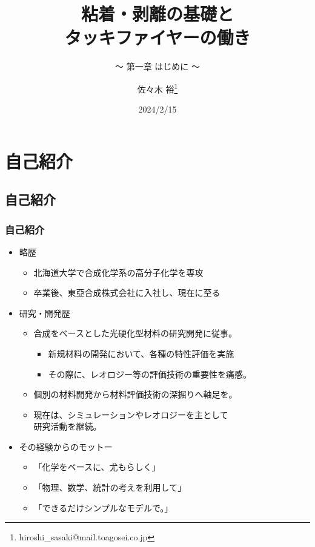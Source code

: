 \documentclass[unicode,12pt]{beamer}%
\title{粘着・剥離の基礎と\\タッキファイヤーの働き}
\subtitle{～ 第一章 はじめに ～}
\author[東亞合成 佐々木]{佐々木 裕\thanks{hiroshi\_sasaki@mail.toagosei.co.jp}}
\institute[東亞合成]{東亞合成株式会社}
\date{2024/2/15}
\begin{document}
\maketitle

\begin{frame} 
    \tableofcontents[]
\end{frame} 


\section{自己紹介}
\subsection{自己紹介}
\begin{frame}
	\frametitle{自己紹介}
	\begin{itemize}
		\item 略歴
			\begin{itemize}
				\item 北海道大学で合成化学系の高分子化学を専攻
				\item 卒業後、東亞合成株式会社に入社し、現在に至る
			\end{itemize}
		\item  研究・開発歴
			\begin{itemize}
				\item 合成をベースとした光硬化型材料の研究開発に従事。
				\begin{itemize}
					\item 新規材料の開発において、各種の特性評価を実施
					\item その際に、レオロジー等の評価技術の重要性を痛感。
				\end{itemize}
				\item 個別の材料開発から材料評価技術の深掘りへ軸足を。
				\item 現在は、シミュレーションやレオロジーを主として\\研究活動を継続。
			\end{itemize}
		\item その経験からのモットー
			\begin{itemize}
				\item 「化学をベースに、尤もらしく」
				\item 「物理、数学、統計の考えを利用して」
				\item 「できるだけシンプルなモデルで。」
			\end{itemize}
	\end{itemize}
	
\end{frame}
\end{document}
